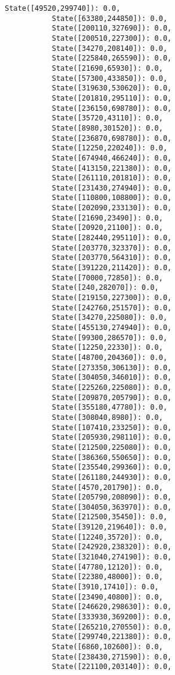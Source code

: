 \documentclass[11pt]{article}
\begin{document}
\begin{Verbatim}[commandchars=\\\{\}]
           State([49520,299740]): 0.0,
           State([63380,244850]): 0.0,
           State([200110,327690]): 0.0,
           State([200510,227300]): 0.0,
           State([34270,208140]): 0.0,
           State([225840,265590]): 0.0,
           State([21690,65930]): 0.0,
           State([57300,433850]): 0.0,
           State([319630,530620]): 0.0,
           State([201810,295110]): 0.0,
           State([236150,698780]): 0.0,
           State([35720,43110]): 0.0,
           State([8980,301520]): 0.0,
           State([236870,698780]): 0.0,
           State([12250,220240]): 0.0,
           State([674940,466240]): 0.0,
           State([413150,221380]): 0.0,
           State([261110,201810]): 0.0,
           State([231430,274940]): 0.0,
           State([110800,108800]): 0.0,
           State([202090,233130]): 0.0,
           State([21690,23490]): 0.0,
           State([20920,21100]): 0.0,
           State([282440,295110]): 0.0,
           State([203770,323370]): 0.0,
           State([203770,564310]): 0.0,
           State([391220,211420]): 0.0,
           State([70000,72850]): 0.0,
           State([240,282070]): 0.0,
           State([219150,227300]): 0.0,
           State([242760,251570]): 0.0,
           State([34270,225080]): 0.0,
           State([455130,274940]): 0.0,
           State([99300,286570]): 0.0,
           State([12250,22330]): 0.0,
           State([48700,204360]): 0.0,
           State([273350,306130]): 0.0,
           State([304050,346010]): 0.0,
           State([225260,225080]): 0.0,
           State([209870,205790]): 0.0,
           State([355180,47780]): 0.0,
           State([308040,8980]): 0.0,
           State([107410,233250]): 0.0,
           State([205930,298110]): 0.0,
           State([212500,225080]): 0.0,
           State([386360,550650]): 0.0,
           State([235540,299360]): 0.0,
           State([261180,244930]): 0.0,
           State([4570,201790]): 0.0,
           State([205790,208090]): 0.0,
           State([304050,363970]): 0.0,
           State([212500,35450]): 0.0,
           State([39120,219640]): 0.0,
           State([12240,35720]): 0.0,
           State([242920,238320]): 0.0,
           State([321040,274190]): 0.0,
           State([47780,12120]): 0.0,
           State([22380,48000]): 0.0,
           State([3910,17410]): 0.0,
           State([23490,40800]): 0.0,
           State([246620,298630]): 0.0,
           State([333930,369200]): 0.0,
           State([265210,270550]): 0.0,
           State([299740,221380]): 0.0,
           State([6860,102600]): 0.0,
           State([238430,271590]): 0.0,
           State([221100,203140]): 0.0,

\end{Verbatim}
\end{document}
